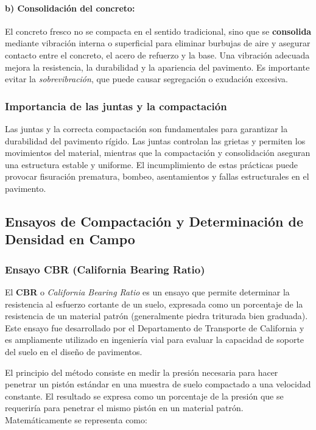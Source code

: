 \documentclass[12pt]{article}
\begin{document}
\paragraph{b) Consolidación del concreto:}
El concreto fresco no se compacta en el sentido tradicional, sino que se \textbf{consolida} mediante vibración interna o superficial para eliminar burbujas de aire y asegurar contacto entre el concreto, el acero de refuerzo y la base. Una vibración adecuada mejora la resistencia, la durabilidad y la apariencia del pavimento. Es importante evitar la \textit{sobrevibración}, que puede causar segregación o exudación excesiva.

\subsubsection{Importancia de las juntas y la compactación}
Las juntas y la correcta compactación son fundamentales para garantizar la durabilidad del pavimento rígido. Las juntas controlan las grietas y permiten los movimientos del material, mientras que la compactación y consolidación aseguran una estructura estable y uniforme. El incumplimiento de estas prácticas puede provocar fisuración prematura, bombeo, asentamientos y fallas estructurales en el pavimento.

	
	
	\subsection{Ensayos de Compactación y Determinación de Densidad en Campo}
	
	\subsubsection{Ensayo CBR (California Bearing Ratio)}
	
	El \textbf{CBR} o \textit{California Bearing Ratio} es un ensayo que permite determinar la resistencia al esfuerzo cortante de un suelo, expresada como un porcentaje de la resistencia de un material patrón (generalmente piedra triturada bien graduada). Este ensayo fue desarrollado por el Departamento de Transporte de California y es ampliamente utilizado en ingeniería vial para evaluar la capacidad de soporte del suelo en el diseño de pavimentos.
	
	El principio del método consiste en medir la presión necesaria para hacer penetrar un pistón estándar en una muestra de suelo compactado a una velocidad constante. El resultado se expresa como un porcentaje de la presión que se requeriría para penetrar el mismo pistón en un material patrón. Matemáticamente se representa como:
	
\end{document}
